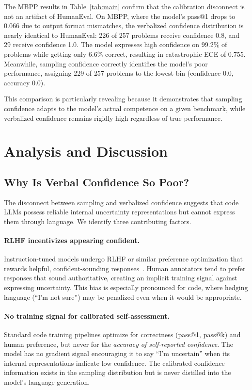 \documentclass{article}
\begin{document}
The MBPP results in Table~\ref{tab:main} confirm that the calibration disconnect is not an artifact of HumanEval. On MBPP, where the model's pass@1 drops to 0.066 due to output format mismatches, the verbalized confidence distribution is nearly identical to HumanEval: 226 of 257 problems receive confidence 0.8, and 29 receive confidence 1.0. The model expresses high confidence on 99.2\% of problems while getting only 6.6\% correct, resulting in catastrophic ECE of 0.755. Meanwhile, sampling confidence correctly identifies the model's poor performance, assigning 229 of 257 problems to the lowest bin (confidence 0.0, accuracy 0.0).

This comparison is particularly revealing because it demonstrates that sampling confidence adapts to the model's actual competence on a given benchmark, while verbalized confidence remains rigidly high regardless of true performance.

\section{Analysis and Discussion}
\label{sec:discussion}

\subsection{Why Is Verbal Confidence So Poor?}

The disconnect between sampling and verbalized confidence suggests that code LLMs possess reliable internal uncertainty representations but cannot express them through language. We identify three contributing factors.

\paragraph{RLHF incentivizes appearing confident.}
Instruction-tuned models undergo RLHF or similar preference optimization that rewards helpful, confident-sounding responses~\citep{tian2023just}. Human annotators tend to prefer responses that sound authoritative, creating an implicit training signal against expressing uncertainty. This bias is especially pronounced for code, where hedging language (``I'm not sure'') may be penalized even when it would be appropriate.

\paragraph{No training signal for calibrated self-assessment.}
Standard code training pipelines optimize for correctness (pass@1, pass@k) and human preference, but never for the \emph{accuracy of self-reported confidence}. The model has no gradient signal encouraging it to say ``I'm uncertain'' when its internal representations indicate low confidence. The calibrated confidence information exists in the sampling distribution but is never distilled into the model's language generation.
\end{document}
